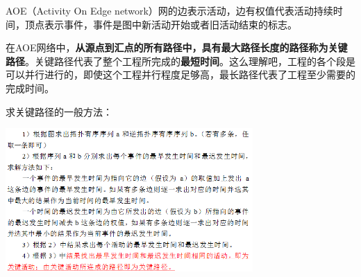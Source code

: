 {AOE（Activity On Edge
network）网的{边表示活动，边有权值代表活动持续时间，顶点表示事件，事件是图中新活动开始或者旧活动结束的标志。}}

{在AOE网络中，{\textbf{从源点到汇点的所有路径中，具有最大路径长度的路径称为关键路径}}。关键路径代表了整个工程所完成的\textbf{{最短时间}}。这么理解吧，工程的各个段是可以并行进行的，即使这个工程并行程度足够高，最长路径代表了工程至少需要的完成时间。}

{求关键路径的一般方法：}

\includegraphics[width=3.70833in,height=2.15625in]{png-jpeg-pics/E7061CD56D902F653AFC2CAED02064D4.png}
